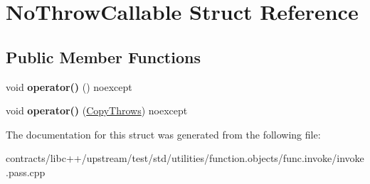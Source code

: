 \hypertarget{struct_no_throw_callable}{}\section{No\+Throw\+Callable Struct Reference}
\label{struct_no_throw_callable}
\subsection*{Public Member Functions}
\begin{DoxyCompactItemize}
\item 
\mbox{\label{struct_no_throw_callable_add59d6c0eb21ce6c4d69dfd4648df645}} 
void {\bfseries operator()} () noexcept
\item 
\mbox{\label{struct_no_throw_callable_a1e0fc26099f61ac1f6630608263bbbd0}} 
void {\bfseries operator()} (\mbox{\hyperlink{struct_copy_throws}{Copy\+Throws}}) noexcept
\end{DoxyCompactItemize}


The documentation for this struct was generated from the following file\+:\begin{DoxyCompactItemize}
\item 
contracts/libc++/upstream/test/std/utilities/function.\+objects/func.\+invoke/invoke.\+pass.\+cpp\end{DoxyCompactItemize}

